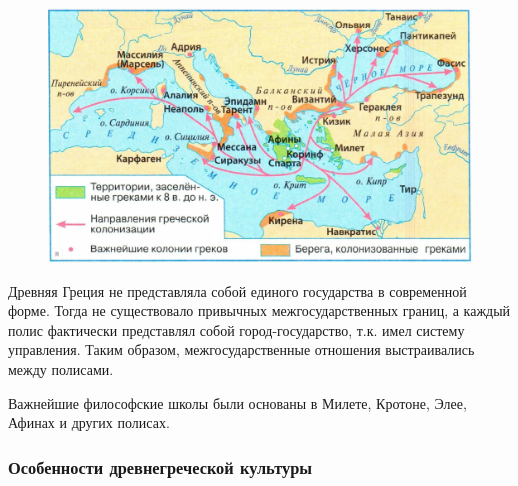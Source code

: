 \begin{figure}
    \centering
    \includegraphics[width=0.5\linewidth]{pictures/greekcolonies.png}
    \label{fig:greekcolonies}
\end{figure}

Древняя Греция не представляла собой единого государства в современной форме. Тогда не существовало привычных межгосударственных границ, а каждый полис фактически представлял собой город-государство, т.к. имел систему управления. Таким образом, межгосударственные отношения выстраивались между полисами. 


Важнейшие философские школы были основаны в Милете, Кротоне, Элее, Афинах и других полисах.

\subsubsection{Особенности древнегреческой культуры}

